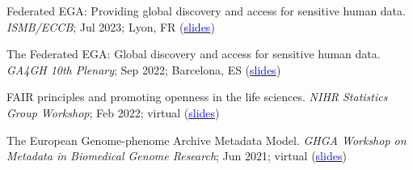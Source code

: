 \documentclass[margin,line]{res}
\begin{document}
\begin{resume}
Federated EGA: Providing global discovery and access for sensitive human data. {\em ISMB/ECCB}; Jul 2023; Lyon, FR (\href{https://docs.google.com/presentation/d/1P9KMd-NAjbz1f9fgO9FVuyYTVAoYZoJAqL0wvnVNrt4/edit?usp=sharing}{\textcolor{blue}{slides}})

The Federated EGA: Global discovery and access for sensitive human data. {\em GA4GH 10th Plenary}; Sep 2022; Barcelona, ES (\href{https://docs.google.com/presentation/d/17wJu5ntPdT1Uj3kSOd_ROHY0DK7IzRwRq6Lgyvso2aw/edit?usp=sharing}{\textcolor{blue}{slides}})


FAIR principles and promoting openness in the life sciences. {\em NIHR Statistics Group Workshop}; Feb 2022; virtual (\href{https://docs.google.com/presentation/d/1BNdhj_Ny7qJ84xmoUuzqIicYXF3UwwcGdJTLtyZkV5I/edit?usp=sharing}{\textcolor{blue}{slides}})

The European Genome-phenome Archive Metadata Model. {\em GHGA Workshop on Metadata in Biomedical Genome Research}; Jun 2021; virtual (\href{https://docs.google.com/presentation/d/14x9PNs3j5mNZWIHBW9k6aiJUekiLYsrbrkpaMihB4ko/edit?usp=sharing}{\textcolor{blue}{slides}})







\end{resume}
\end{document}
